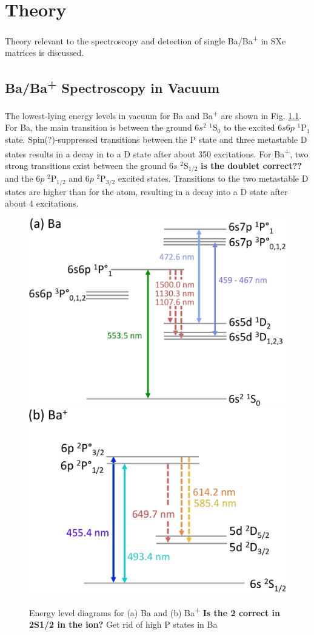 \chapter{Theory}

Theory relevant to the spectroscopy and detection of single Ba/Ba\textsuperscript{+} in SXe matrices is discussed.  

\section{Ba/Ba\textsuperscript{+} Spectroscopy in Vacuum}

The lowest-lying energy levels in vacuum for Ba and Ba\textsuperscript{+} are shown in Fig. \ref{fig:elevs}.  For Ba, the main transition is between the ground $6s^{2}$ $^{1}$S$_{0}$ to the excited $6s6p$ $^{1}$P$_{1}$ state.  Spin{\color{red}(?)}-suppressed transitions between the P state and three metastable D states results in a decay in to a D state after about 350 excitations.  For Ba\textsuperscript{+}, two strong transitions exist between the ground $6s$ $^{2}$S$_{1/2}$ \textbf{{\color{red}is the doublet correct??}} and the $6p$ $^{2}$P$_{1/2}$ and $6p$ $^{2}$P$_{3/2}$ excited states.  Transitions to the two metastable D states are higher than for the atom, resulting in a decay into a D state after about 4 excitations.

\begin{figure}[H]
	\includegraphics[width=.35\textwidth]{figures/BaLevs_atom.pdf}
	\includegraphics[width=.35\textwidth]{figures/BaLevs_ion.pdf}
	\caption{Energy level diagrams for (a) Ba and (b) Ba\textsuperscript{+} {\color{red}\textbf{Is the 2 correct in 2S1/2 in the ion?}  Get rid of high P states in Ba}}
    \label{fig:elevs}
\end{figure}

